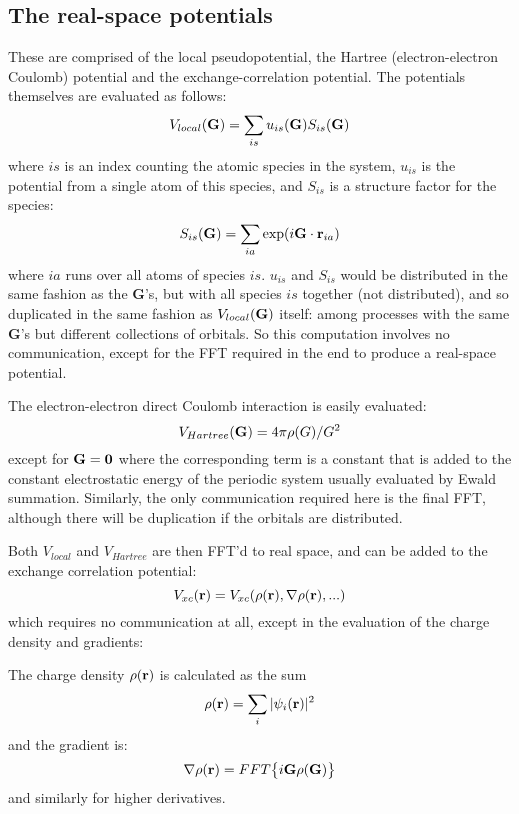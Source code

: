 \subsection{The real-space potentials}

These are comprised of the local pseudopotential, the Hartree
(electron-electron Coulomb) potential and  the exchange-correlation potential.
The potentials themselves are evaluated as follows:
\begin{equation}
V_{local}({\bf G}) = \sum_{is} u_{is}({\bf G}) S_{is}({\bf G})
\end{equation}
where $is$ is an index counting the atomic species in the system,
$u_{is}$ is the potential from a single atom of this species, and
$S_{is}$ is a structure factor for the species:
\begin{equation}
S_{is}({\bf G}) = \sum_{ia} \exp(i {\bf G}\cdot {\bf r}_{ia})
\end{equation}
where $ia$ runs over all atoms of species $is$. $u_{is}$ and $S_{is}$
would be distributed in the same fashion as the {\bf G}'s, but with
all species $is$ together (not distributed), and so duplicated
in the same fashion as $V_{local}({\bf G})$ itself: among processes with the
same {\bf G}'s but different collections of orbitals. So this computation
involves no communication, except for the FFT required in the end
to produce a real-space potential.

The electron-electron direct Coulomb interaction is easily evaluated:
\begin{equation}
V_{Hartree}({\bf G}) = 4\pi \rho(G)/G^2
\end{equation}
except for ${\bf G} = {\bf 0}$ where the corresponding term is
a constant that is added to the constant electrostatic energy of the
periodic system usually evaluated by Ewald summation. Similarly, the
only communication required here is the final FFT, although there
will be duplication if the orbitals are distributed.

Both $V_{local}$ and $V_{Hartree}$ are then FFT'd to real space, and
can be added to the exchange correlation potential:
\begin{equation}
V_{xc}({\bf r}) = V_{xc}(\rho({\bf r}), \nabla \rho({\bf r}), ...)
\end{equation}
which requires no communication at all, except in the
evaluation of the charge density and gradients:

The charge density $\rho({\bf r})$ is calculated as the sum
\begin{equation}
\rho({\bf r}) = \sum_{i} |\psi_i({\bf r})|^2
\end{equation}
and the gradient is:
\begin{equation}
\nabla\rho({\bf r}) = FFT \bigl\{ i {\bf G} \rho({\bf G}) \bigr\}
\end{equation}
and similarly for higher derivatives.

